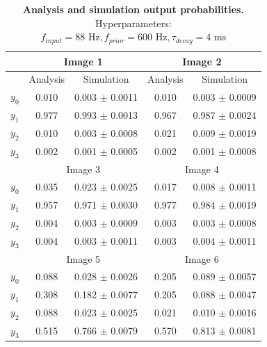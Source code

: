 \begin{table}[]
\centering
\label{tab:1D_88_600_4}
\small
\tabcolsep=0.11cm
\begin{tabular}{|c|cc|cc|}
\hline
                       & \multicolumn{2}{c|}{Image 1}                       & \multicolumn{2}{c|}{Image 2}                       \\ \hline
                       & \multicolumn{1}{c|}{Analysis} & Simulation         & \multicolumn{1}{c|}{Analysis} & Simulation         \\ \hline
$y_0$                  & \multicolumn{1}{c|}{0.010}    & 0.003 $\pm$ 0.0011 & \multicolumn{1}{c|}{0.010}    & 0.003 $\pm$ 0.0009 \\ \hline
$y_1$                  & \multicolumn{1}{c|}{0.977}    & 0.993 $\pm$ 0.0013 & \multicolumn{1}{c|}{0.967}    & 0.987 $\pm$ 0.0024 \\ \hline
$y_2$                  & \multicolumn{1}{c|}{0.010}    & 0.003 $\pm$ 0.0008 & \multicolumn{1}{c|}{0.021}    & 0.009 $\pm$ 0.0019 \\ \hline
$y_3$                  & \multicolumn{1}{c|}{0.002}    & 0.001 $\pm$ 0.0005 & \multicolumn{1}{c|}{0.002}    & 0.001 $\pm$ 0.0008 \\ \hline
                       & \multicolumn{2}{c|}{Image 3}                       & \multicolumn{2}{c|}{Image 4}                       \\ \hline
$y_0$                  & \multicolumn{1}{c|}{0.035}    & 0.023 $\pm$ 0.0025 & \multicolumn{1}{c|}{0.017}    & 0.008 $\pm$ 0.0011 \\ \hline
$y_1$                  & \multicolumn{1}{c|}{0.957}    & 0.971 $\pm$ 0.0030 & \multicolumn{1}{c|}{0.977}    & 0.984 $\pm$ 0.0019 \\ \hline
$y_2$                  & \multicolumn{1}{c|}{0.004}    & 0.003 $\pm$ 0.0009 & \multicolumn{1}{c|}{0.003}    & 0.003 $\pm$ 0.0008 \\ \hline
$y_3$                  & \multicolumn{1}{c|}{0.004}    & 0.003 $\pm$ 0.0011 & \multicolumn{1}{c|}{0.003}    & 0.004 $\pm$ 0.0011 \\ \hline
						& \multicolumn{2}{c|}{Image 5}                       & \multicolumn{2}{c|}{Image 6}                       \\ \hline
$y_0$                  & \multicolumn{1}{c|}{0.088}    & 0.028 $\pm$ 0.0026 & \multicolumn{1}{c|}{0.205}    & 0.089 $\pm$ 0.0057 \\ \hline
$y_1$                  & \multicolumn{1}{c|}{0.308}    & 0.182 $\pm$ 0.0077 & \multicolumn{1}{c|}{0.205}    & 0.088 $\pm$ 0.0047 \\ \hline
$y_2$                  & \multicolumn{1}{c|}{0.088}    & 0.023 $\pm$ 0.0025 & \multicolumn{1}{c|}{0.021}    & 0.010 $\pm$ 0.0016 \\ \hline
$y_3$                  & \multicolumn{1}{c|}{0.515}    & 0.766 $\pm$ 0.0079 & \multicolumn{1}{c|}{0.570}    & 0.813 $\pm$ 0.0081 \\ \hline
\end{tabular}
\caption{\textbf{Analysis and simulation output probabilities. } Hyperparameters: $f_{input} = 88\text{ Hz}, f_{prior} = 600\text{ Hz}, \tau_{decay} = 4\text{ ms}$}
\end{table}
